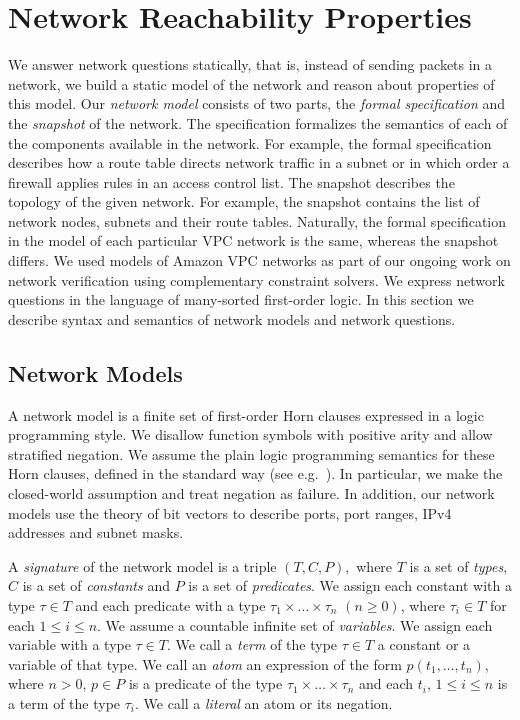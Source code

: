 \section{Network Reachability Properties}
\label{sect:aws/specification}
We answer network questions statically, that is, instead of sending packets in a network, we build a static model of the network and reason about properties of this model. Our \emph{network model} consists of two parts, the \emph{formal specification} and the \emph{snapshot} of the network. The specification formalizes the semantics of each of the components available in the network. For example, the formal specification describes how a route table directs network traffic in a subnet or in which order a firewall applies rules in an access control list. The snapshot describes the topology of the given network. For example, the snapshot contains the list of network nodes, subnets and their route tables. Naturally, the formal specification in the model of each particular VPC network is the same, whereas the snapshot differs. We used models of Amazon VPC networks as part of our ongoing work on network verification using complementary constraint solvers. We express network questions in the language of many-sorted first-order logic. In this section we describe syntax and semantics of network models and network questions.

\subsection{Network Models}
\label{sect:aws/reachability/spec}
A network model is a finite set of first-order Horn clauses expressed in a logic programming style. We disallow function symbols with positive arity and allow stratified negation. We assume the plain logic programming semantics for these Horn clauses, defined in the standard way (see e.g.~\cite{DBLP:books/sp/Lloyd87}). In particular, we make the closed-world assumption and treat negation as failure. In addition, our network models use the theory of bit vectors to describe ports, port ranges, IPv4 addresses and subnet masks.

A \emph{signature} of the network model is a triple $(T, C, P),$ where $T$ is a set of \emph{types}, $C$ is a set of \emph{constants} and $P$ is a set of \emph{predicates}. We assign each constant with a type $\tau\in T$ and each predicate with a type $\tau_1\times\ldots\times\tau_n$ $(n\ge0)$, where $\tau_i\in T$ for each $1\leq i \leq n$. We assume a countable infinite set of \emph{variables}. We assign each variable with a type $\tau\in T$. We call a \emph{term} of the type $\tau\in T$ a constant or a variable of that type. We call an \emph{atom} an expression of the form $p(t_1,\ldots,t_n)$, where $n>0$, $p\in P$ is a predicate of the type $\tau_1\times\ldots\times\tau_n$ and each $t_i$, $1\leq i \leq n$ is a term of the type $\tau_i$. We call a \emph{literal} an atom or its negation.

